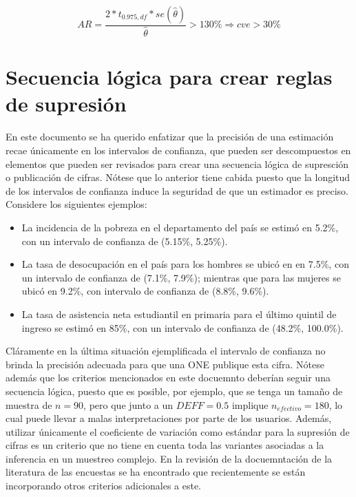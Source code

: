 \documentclass[12pt,spanish,]{book}
\providecommand{\tightlist}{%
  \setlength{\itemsep}{0pt}\setlength{\parskip}{0pt}}
\begin{document}
\[
AR = \frac{2*t_{0.975, df} * se(\hat\theta)}{\hat\theta} > 130\% \Rightarrow cve > 30\%
\]

\hypertarget{secuencia-logica-para-crear-reglas-de-supresion}{%
\section{Secuencia lógica para crear reglas de supresión}\label{secuencia-logica-para-crear-reglas-de-supresion}}

En este documento se ha querido enfatizar que la precisión de una estimación recae únicamente en los intervalos de confianza, que pueden ser descompuestos en elementos que pueden ser revisados para crear una secuencia lógica de supresción o publicación de cifras. Nótese que lo anterior tiene cabida puesto que la longitud de los intervalos de confianza induce la seguridad de que un estimador es preciso. Considere los siguientes ejemplos:

\begin{itemize}
\tightlist
\item
  La incidencia de la pobreza en el departamento del país se estimó en 5.2\%, con un intervalo de confianza de (5.15\%, 5.25\%).
\item
  La tasa de desocupación en el país para los hombres se ubicó en en 7.5\%, con un intervalo de confianza de (7.1\%, 7.9\%); mientras que para las mujeres se ubicó en 9.2\%, con intervalo de confianza de (8.8\%, 9.6\%).
\item
  La tasa de asistencia neta estudiantil en primaria para el último quintil de ingreso se estimó en 85\%, con un intervalo de confianza de (48.2\%, 100.0\%).
\end{itemize}

Cláramente en la última situación ejemplificada el intervalo de confianza no brinda la precisión adecuada para que una ONE publique esta cifra. Nótese además que los criterios mencionados en este docuemnto deberían seguir una secuencia lógica, puesto que es posible, por ejemplo, que se tenga un tamaño de muestra de \(n=90\), pero que junto a un \(DEFF=0.5\) implique \(n_{efectivo}=180\), lo cual puede llevar a malas interpretaciones por parte de los usuarios. Además, utilizar únicamente el coeficiente de variación como estándar para la supresión de cifras es un criterio que no tiene en cuenta toda las variantes asociadas a la inferencia en un muestreo complejo. En la revisión de la docuemntación de la literatura de las encuestas se ha encontrado que recientemente se están incorporando otros criterios adicionales a este.
\end{document}
